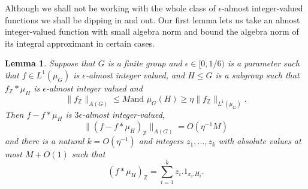 \documentclass[12pt]{amsart}
\numberwithin{equation}{section}
\theoremstyle{plain}
\newtheorem{lemma}[subsection]{Lemma}
\theoremstyle{definition}
\renewcommand{\leq}{\leqslant}
\renewcommand{\geq}{\geqslant}
\newcommand{\Z}{\mathbb{Z}}
\begin{document}
Although we shall not be working with the whole class of $\epsilon$-almost integer-valued functions we shall be dipping in and out.  Our first lemma lets us take an almost integer-valued function with small algebra norm and bound the algebra norm of its integral approximant in certain cases.
\begin{lemma}\label{lem.apxalg}
Suppose that $G$ is a finite group and $\epsilon \in [0,1/6)$ is a parameter such that $f \in L^1(\mu_G)$ is $\epsilon$-almost integer valued, and $H \leq G$ is a subgroup such that $f_\Z \ast \mu_H$ is $\epsilon$-almost integer valued and
\begin{equation*}
\|f_\Z\|_{A(G)} \leq M \textrm{and } \mu_G(H) \geq \eta\|f_{\Z}\|_{L^1(\mu_G)}.
\end{equation*}
Then $f-f \ast \mu_H$ is $3\epsilon$-almost integer-valued,
\begin{equation*}
\|(f-f\ast \mu_H)_{\Z}\|_{A(G)} =O(\eta^{-1}M)
\end{equation*}
and there is a natural $k=O(\eta^{-1})$ and integers $z_1,\dots,z_k$ with absolute values at most  $M+O(1)$ such that
\begin{equation*}
(f \ast \mu_H)_{\Z}=\sum_{i=1}^k{z_i.1_{x_i.H_i}}.
\end{equation*}
\end{lemma}
\end{document}
